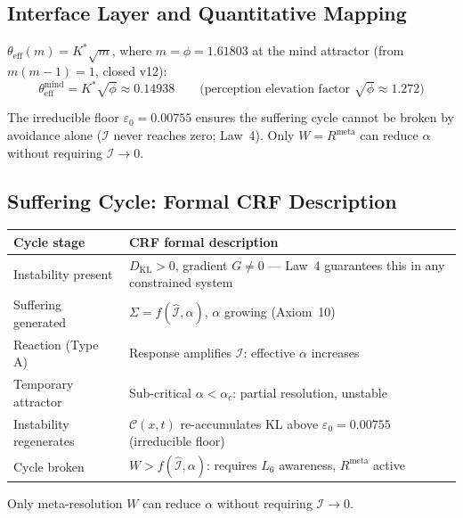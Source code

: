 \documentclass[12pt, a4paper]{article}
\begin{document}
\subsection{Interface Layer and Quantitative Mapping}

$\theta_{\mathrm{eff}}(m) = K^*\sqrt{m}$, where $m = \phi = 1.61803$ at the mind
attractor (from $m(m-1) = 1$, closed v12):
\[
  \theta_{\mathrm{eff}}^{\mathrm{mind}} = K^*\sqrt{\phi} \approx 0.14938
  \qquad\text{(perception elevation factor }\sqrt{\phi}\approx 1.272\text{)}
\]

The irreducible floor $\varepsilon_0 = 0.00755$ ensures the suffering cycle cannot be
broken by avoidance alone ($\mathcal{I}$ never reaches zero; Law~4). Only
$W = R^{\mathrm{meta}}$ can reduce $\alpha$ without requiring $\mathcal{I}\to 0$.

\subsection{Suffering Cycle: Formal CRF Description}

\begin{derivedbox}[title={Suffering Cycle in CRF Formal Description}]
\begin{center}
\renewcommand{\arraystretch}{1.2}
\begin{tabular}{p{3cm} p{9cm}}
\toprule
\textbf{Cycle stage} & \textbf{CRF formal description} \\
\midrule
Instability present & $D_{\mathrm{KL}} > 0$, gradient $G\neq 0$ --- Law~4 guarantees this in any constrained system \\
Suffering generated & $\Sigma = f(\hat{\mathcal{I}},\alpha)$, $\alpha$ growing (Axiom~10) \\
Reaction (Type A) & Response amplifies $\mathcal{I}$: effective $\alpha$ increases \\
Temporary attractor & Sub-critical $\alpha < \alpha_c$: partial resolution, unstable \\
Instability regenerates & $\mathcal{C}(x,t)$ re-accumulates KL above $\varepsilon_0 = 0.00755$ (irreducible floor) \\
Cycle broken & $W > f(\hat{\mathcal{I}},\alpha)$: requires $L_6$ awareness, $R^{\mathrm{meta}}$ active \\
\bottomrule
\end{tabular}
\end{center}
Only meta-resolution $W$ can reduce $\alpha$ without requiring $\mathcal{I}\to 0$.
\end{derivedbox}
\end{document}
